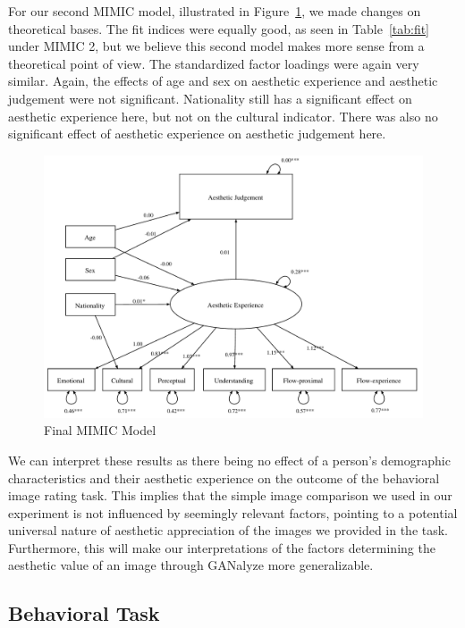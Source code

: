 \documentclass[../main.tex]{subfiles}
\begin{document}
	For our second MIMIC model, illustrated in Figure~\ref{fig:finalmodel}, we made changes on theoretical bases. The fit indices were equally good, as seen in Table~\ref{tab:fit} under MIMIC 2, but we believe this second model makes more sense from a theoretical point of view. The standardized factor loadings were again very similar. Again, the effects of age and sex on aesthetic experience and aesthetic judgement were not significant. Nationality still has a significant effect on aesthetic experience here, but not on the cultural indicator. There was also no significant effect of aesthetic experience on aesthetic judgement here.

	\begin{figure}[t]
		\caption{Final MIMIC Model}
		\label{fig:finalmodel}
		\includegraphics[width=1\linewidth]{images/model3.pdf}
	\end{figure}

	We can interpret these results as there being no effect of a person's demographic characteristics and their aesthetic experience on the outcome of the behavioral image rating task. This implies that the simple image comparison we used in our experiment is not influenced by seemingly relevant factors, pointing to a potential universal nature of aesthetic appreciation of the images we provided in the task. Furthermore, this will make our interpretations of the factors determining the aesthetic value of an image through GANalyze more generalizable.
	


	\subsection{Behavioral Task}
	
\end{document}
